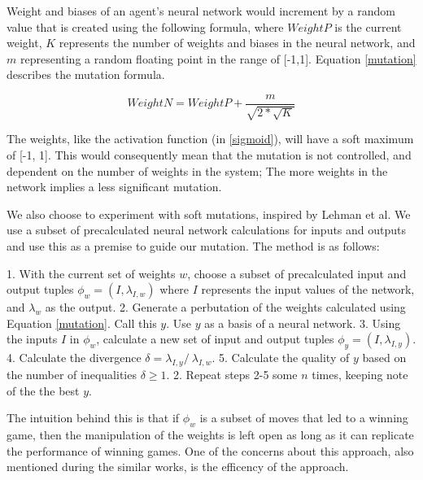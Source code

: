 \documentclass[12pt,a4paper]{article}
\begin{document}
            Weight and biases of an agent's neural network would increment by a random value that is created using the following formula, where $WeightP$ is the current weight, $K$ represents the number of weights and biases in the neural network, and $m$ representing a random floating point in the range of [-1,1]. Equation \ref{mutation} describes the mutation formula.

            \begin{equation} \label{mutation}
                WeightN = WeightP + \frac{m}{\sqrt{2 * \sqrt{K} }}
            \end{equation}

            The weights, like the activation function (in \ref{sigmoid}), will have a soft maximum of [-1, 1]. This would consequently mean that the mutation is not controlled, and dependent on the number of weights in the system; The more weights in the network implies a less significant mutation.
            
             We also choose to experiment with soft mutations, inspired by Lehman et al. \cite{lehman_safe_2017} We use a subset of precalculated neural network calculations for inputs and outputs and use this as a premise to guide our mutation. The method is as follows:
             
             1. With the current set of weights $w$, choose a subset of precalculated input and output tuples $\phi_{w} = (I, \lambda_{I,w})$ where $I$ represents the input values of the network, and $\lambda_{w}$ as the output.
             2. Generate a perbutation of the weights calculated using Equation \ref{mutation}. Call this $y$. Use $y$ as a basis of a neural network. 
             3. Using the inputs $I$ in $\phi_{w}$, calculate a new set of input and output tuples $\phi_{y} = (I, \lambda_{I,y})$.
             4. Calculate the divergence $\delta = \lambda_{I,y} /\ \lambda_{I,w}.$ 
             5. Calculate the quality of $y$ based on the number of inequalities $\delta \geq 1$.
             2. Repeat steps 2-5 some $n$ times, keeping note of the the best $y$. 

            The intuition behind this is that if $\phi_{w}$ is a subset of moves that led to a winning game, then the manipulation of the weights is left open as long as it can replicate the performance of winning games. One of the concerns about this approach, also mentioned during the similar works, is the efficency of the approach. %
            
\end{document}
